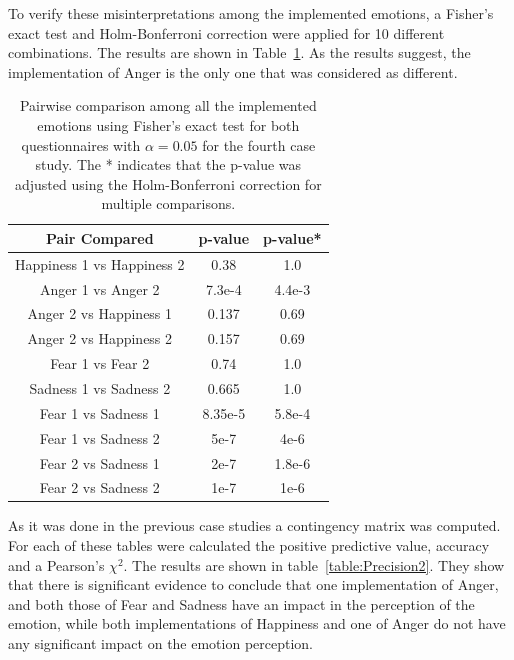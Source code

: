 To verify these misinterpretations among the implemented emotions, a Fisher's exact test and Holm-Bonferroni correction were applied for 10 different combinations. The results are shown in Table~\ref{table:result_compare_fourth}. As the results suggest, the implementation of Anger is the only one that was considered as different.\\
\begin{table}
\centering
\small
\caption{Pairwise comparison among all the implemented emotions using Fisher's exact test for both questionnaires with $\alpha = 0.05$ for the fourth case study. The * indicates that the p-value was adjusted using the Holm-Bonferroni correction for multiple comparisons.}
		\label{table:result_compare_fourth}
		\begin{tabular}{|c|c|c|}
			\hline	
\textbf{Pair Compared} & \textbf{p-value} & \textbf{p-value*}\\	
			\hline
			Happiness 1 vs Happiness 2 &0.38&1.0\\
			\hline
			Anger 1 vs Anger 2 & 7.3e-4&4.4e-3\\
			\hline
			Anger 2 vs Happiness 1 & 0.137&0.69\\
			\hline
			Anger 2 vs Happiness 2 & 0.157&0.69\\
			\hline
			Fear 1 vs Fear 2 & 0.74&1.0\\
			\hline
			Sadness 1 vs Sadness 2 & 0.665&1.0\\
			\hline
			Fear 1 vs Sadness 1& 8.35e-5&5.8e-4\\
			\hline
			Fear 1 vs Sadness 2 & 5e-7&4e-6\\
			\hline
			Fear 2 vs Sadness 1 & 2e-7&1.8e-6\\
			\hline
			Fear 2 vs Sadness 2 & 1e-7&1e-6\\
			\hline
			\end{tabular}
\end{table} 
As it was done in the previous case studies a contingency matrix was computed.
For each of these tables were calculated the positive predictive value, accuracy and a Pearson's $\chi^2$. The results are shown in table~\ref{table:Precision2}. They show that there is significant evidence to conclude that one implementation of Anger, and both those of Fear and Sadness have an impact in the perception of the emotion, while both implementations of Happiness and one of Anger do not have any significant impact on the emotion perception.\\
\clearpage
